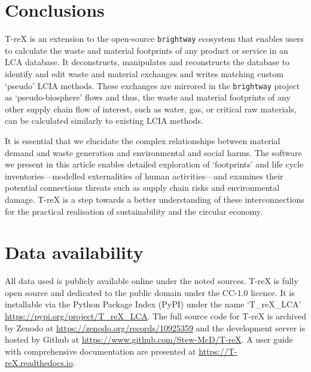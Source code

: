 \documentclass[a4paper,fleqn,longmktitle]{cas-dc}
\begin{document}
\section{Conclusions}\label{sec:conclusions}

T-reX is an extension to the open-source \texttt{brightway} ecosystem that enables users to calculate the waste and material footprints of any product or service in an LCA database. It deconstructs, manipulates and reconstructs the database to identify and edit waste and material exchanges and writes matching custom `pseudo' LCIA methods. These exchanges are mirrored in the \texttt{brightway} project as `pseudo-biosphere' flows and thus, the waste and material footprints of any other supply chain flow of interest, such as water, gas, or critical raw materials, can be calculated similarly to existing LCIA methods.

It is essential that we elucidate the complex relationships between material demand and waste generation and environmental and social harms. The software we present in this article enables detailed exploration of `footprints' and life cycle inventories---modelled externalities of human activities---and examines their potential connections threats such as supply chain risks and environmental damage. T-reX is a step towards a better understanding of these interconnections for the practical realisation of sustainability and the circular economy.

\section*{Data availability}
All data used is publicly available online under the noted sources. T-reX is fully open source and dedicated to the public domain under the CC-1.0 licence. It is installable via the Python Package Index (PyPI) under the name `T\_reX\_LCA' \url{https://pypi.org/project/T_reX_LCA}.
The full source code for T-reX is archived by Zenodo at \url{https://zenodo.org/records/10925359} and the development server is hosted by Github at \url{https://www.github.com/Stew-McD/T-reX}. A user guide with comprehensive documentation are presented at \url{https://T-reX.readthedocs.io}.

\end{document}
